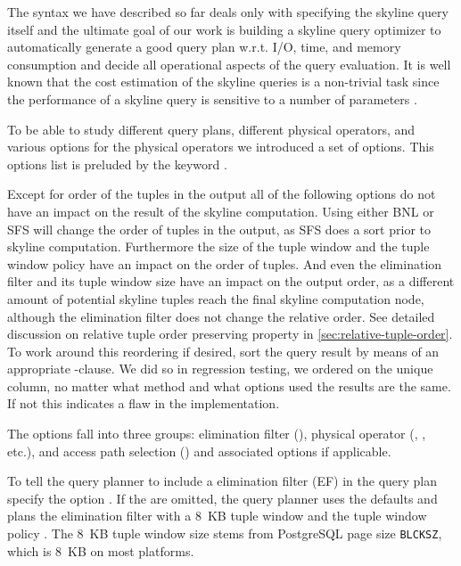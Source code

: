 The syntax we have described so far deals only with specifying the
skyline query itself and the ultimate goal of our work is building a
skyline query optimizer to automatically generate a good query plan
w.r.t. I/O, time, and memory consumption and decide all operational
aspects of the query evaluation.  It is well known that the cost
estimation of the skyline queries is a non-trivial task
\citep{Chaudhuri2006} since the performance of a skyline query is
sensitive to a number of parameters \citep{Godfrey2007}.

To be able to study different query plans, different physical
operators, and various options for the physical operators we
introduced a set of options. This options list is preluded by the
keyword .

Except for order of the tuples in the output all of the following
options do not have an impact on the result of the skyline
computation. Using either BNL or SFS will change the order of tuples in
the output, as SFS does a sort prior to skyline
computation. Furthermore the size of the tuple window and the tuple
window policy have an impact on the order of tuples. And even the
elimination filter and its tuple window size have an impact on the
output order, as a different amount of potential skyline tuples reach
the final skyline computation node, although the elimination filter
does not change the relative order.  See detailed discussion on
relative tuple order preserving property in
\autoref{sec:relative-tuple-order}.  
To work around this reordering if
desired, sort the query result by means of an appropriate
-clause.  
We did so in regression testing, we
ordered on the unique  column, no matter what method and
what options used the results are the same. If not this indicates a
flaw in the implementation.

The options fall into three groups: elimination filter
(), physical operator (, ,
etc.), and access path selection () and associated
options if applicable.

To tell the query planner to include a elimination filter (EF) in the
query plan specify the option .  
If the
 are omitted, the query planner uses the defaults
and plans the elimination filter with a 8~KB tuple window and the
tuple window policy . The 8~KB tuple window size
stems from PostgreSQL page size \texttt{BLCKSZ}, which is 8~KB on most
platforms.

